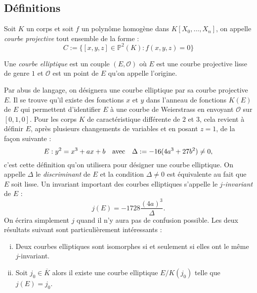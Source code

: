 \documentclass[a4paper]{article} %
\numberwithin{section}{part}
\numberwithin{equation}{section}
\newcommand\EO{\mathcal{O}}
\newcommand\PP[1]{\mathbb{P}^{#1}}
\begin{document}
\subsection{Définitions}
Soit $K$ un corps et soit $f$ un polynôme homogène dans $K[X_0,\dots,X_n]$, on
appelle \emph{courbe projective} tout ensemble de la forme :
\begin{equation}
C := \lbrace{[x,y,z]\in \PP{2}(K) : f(x,y,z) = 0}\rbrace
\end{equation}
\begin{defn}
Une \emph{courbe elliptique} est un couple $(E,\EO)$ où $E$ est une courbe 
projective lisse de genre $1$ et $\EO$ est un point de $E$ qu'on appelle 
l'origine.
\end{defn}
Par abus de langage, on désignera une courbe elliptique par sa courbe projective
$E$. Il se trouve qu'il existe des fonctions $x$ et $y$ dans l'anneau de 
fonctions $K(E)$ de $E$ qui permettent d'identifier $E$ à une courbe de 
Weierstrass en envoyant $\EO$ sur $[0,1,0]$. Pour les corps $K$ de 
caractéristique différente de $2$ et $3$, cela revient à définir $E$, après 
plusieurs changements de variables et en posant $z = 1$, de la façon suivante :
\begin{equation}
\label{eq:weiersimpl}
E : y^2 = x^3 + ax + b\quad\textup{avec}\quad \Delta := -16(4a^3 + 27b^2)\neq 0,
\end{equation}
c'est cette définition qu'on utilisera pour désigner une courbe elliptique. On
appelle $\Delta$ le \emph{discriminant} de $E$ et la condition $\Delta\neq0$ est
équivalente au fait que $E$ soit lisse. Un invariant important des courbes 
elliptiques s'appelle le \emph{$j$-invariant} de $E$ :
\begin{equation}
j(E) = -1728\dfrac{(4a)^3}{\Delta}.
\end{equation}
On écrira simplement $j$ quand il n'y aura pas de confusion possible. Les deux
résultats suivant sont particulièrement intéressants :
\begin{prop}
\label{prop:j-invariant}
\begin{enumerate}[(i)]
    \item Deux courbes elliptiques sont isomorphes si et seulement si elles ont
    le même $j$-invariant.
    \item Soit $j_0\in\overline{K}$ alors il existe une courbe elliptique
    $E/K(j_0)$ telle que $j(E) = j_0$.
\end{enumerate}
\end{prop}
\end{document}
